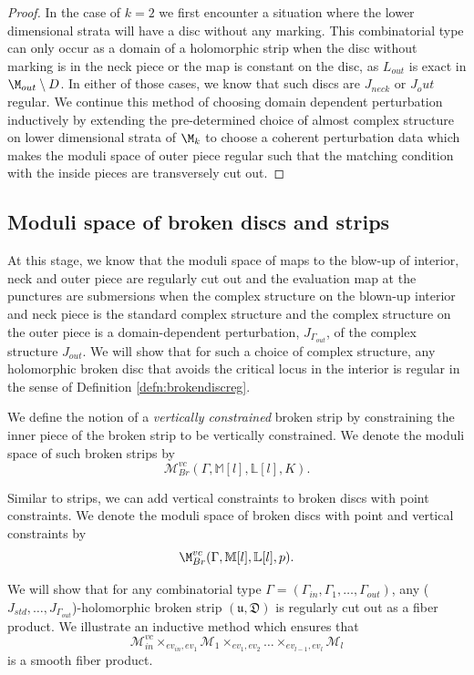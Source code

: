 \begin{proof}
In the case of $k=2$ we first encounter a situation where the lower dimensional strata will have a disc without any marking. This combinatorial type can only occur as a domain of a holomorphic strip when the disc without marking is in the neck piece or the map is constant on the disc, as $L_{out}$ is exact in $\M_{out} \setminus D$. In either of those cases, we know that such discs are $J_{neck}$ or $J_out$ regular. We continue this method of choosing domain dependent perturbation inductively by extending the pre-determined choice of almost complex structure on lower dimensional strata of $\M_k$ to choose a coherent perturbation data which makes the moduli space of outer piece regular such that the matching condition with the inside pieces are transversely cut out.
\end{proof}







\subsection{Moduli space of broken discs and strips}

At this stage, we know that the moduli space of maps to the blow-up of interior, neck and outer piece are regularly cut out and the evaluation map at the punctures are submersions when the complex structure on the blown-up interior and neck piece is the standard complex structure and the complex structure on the outer piece is a domain-dependent perturbation, $J_{\Gamma_{out}}$, of the complex structure $J_{out}$. We will show that for such a choice of complex structure, any holomorphic broken disc that avoids the critical locus in the interior is regular in the sense of Definition \ref{defn:brokendiscreg}. 

We define the notion of a \textit{vertically constrained} broken strip by constraining the inner piece of the broken strip to be vertically constrained. We denote the moduli space of such broken strips by $$\mathcal{M}^{vc}_{Br}(\Gamma,\mathbb{M}[l],\mathbb{L}[l],K).$$

Similar to strips, we can add vertical constraints to broken discs with point constraints. We denote the moduli space of broken discs with point and vertical constraints by $$\M^{vc}_{Br}(\Gamma,\mathbb M [l], \mathbb{L}[l],p).$$

We will show that for any combinatorial type $\Gamma = (\Gamma_{in},\Gamma_1,\dots,\Gamma_{out})$, any ($J_{std},\dots,J_{\Gamma_{out}}$)-holomorphic broken strip $\mathfrak{(u,D)}$ is regularly cut out as a fiber product. We illustrate an inductive method which ensures that $$\mathcal{M}^{vc}_{in} \times_{ev_{in},ev_1} \mathcal{M}_1 \times_{ev_1,ev_2} \dots \times_{ev_{l-1},ev_l}\mathcal{M}_l $$ is a smooth fiber product.


